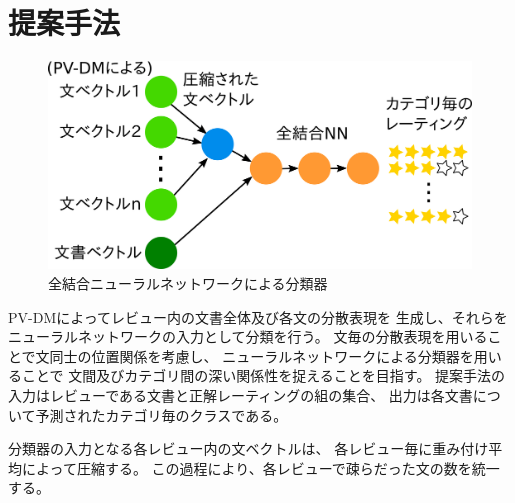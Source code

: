\documentclass{ttisummary}
\makeatletter
\let\tti@includegraphics\includegraphics
\renewcommand{\includegraphics}[1]{\tti@includegraphics[width=\linewidth]{#1}}
\makeatother
\begin{document}
\section{提案手法}

\begin{figure}[t!]
  \includegraphics{fig/model.png}
  \caption{全結合ニューラルネットワークによる分類器}
  \label{fig:MyModel}
\end{figure}

PV-DMによってレビュー内の文書全体及び各文の分散表現を
生成し、それらをニューラルネットワークの入力として分類を行う。
文毎の分散表現を用いることで文同士の位置関係を考慮し、
ニューラルネットワークによる分類器を用いることで
文間及びカテゴリ間の深い関係性を捉えることを目指す。
提案手法の入力はレビューである文書と正解レーティングの組の集合、
出力は各文書について予測されたカテゴリ毎のクラスである。

分類器の入力となる各レビュー内の文ベクトルは、
各レビュー毎に重み付け平均によって圧縮する。
この過程により、各レビューで疎らだった文の数を統一する。
\end{document}
